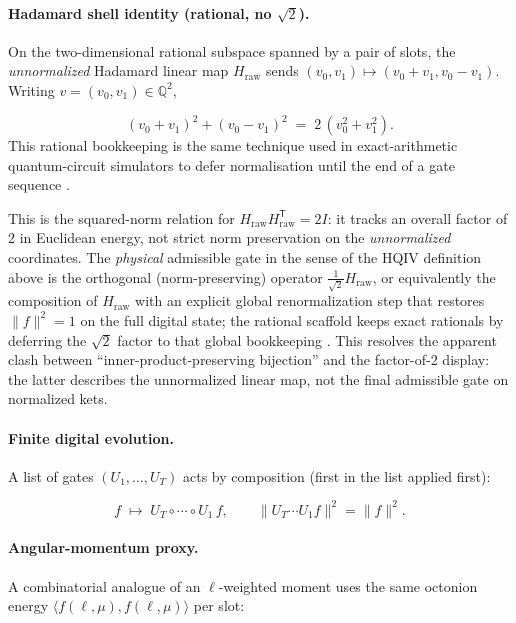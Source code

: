 \documentclass[11pt,a4paper]{article}
\theoremstyle{remark}
\begin{document}
\paragraph{Hadamard shell identity (rational, no $\sqrt{2}$).}
On the two-dimensional rational subspace spanned by a pair of slots, the \emph{unnormalized} Hadamard linear map $H_{\mathrm{raw}}$ sends $(v_0,v_1)\mapsto(v_0+v_1,v_0-v_1)$. Writing $v=(v_0,v_1)\in\mathbb{Q}^2$,

\begin{equation}
  (v_0+v_1)^2 + (v_0-v_1)^2 \;=\; 2\,(v_0^2+v_1^2).
\end{equation}
This rational bookkeeping is the same technique used in exact-arithmetic quantum-circuit simulators to defer normalisation until the end of a gate sequence \cite{smith2019exact}.

This is the squared-norm relation for $H_{\mathrm{raw}}H_{\mathrm{raw}}^{\mathsf T}=2I$: it tracks an overall factor of $2$ in Euclidean energy, not strict norm preservation on the \emph{unnormalized} coordinates. The \emph{physical} admissible gate in the sense of the HQIV definition above is the orthogonal (norm-preserving) operator $\tfrac{1}{\sqrt{2}}H_{\mathrm{raw}}$, or equivalently the composition of $H_{\mathrm{raw}}$ with an explicit global renormalization step that restores $\|f\|^2=1$ on the full digital state; the rational scaffold keeps exact rationals by deferring the $\sqrt{2}$ factor to that global bookkeeping \cite{hadamardMatrixMathWorld}. This resolves the apparent clash between ``inner-product-preserving bijection'' and the factor-of-$2$ display: the latter describes the unnormalized linear map, not the final admissible gate on normalized kets.

\paragraph{Finite digital evolution.}
A list of gates $(U_1,\ldots,U_T)$ acts by composition (first in the list applied first):

\begin{equation}
  f \;\mapsto\; U_T\circ\cdots\circ U_1\,f,
  \qquad
  \|U_T\cdots U_1 f\|^2=\|f\|^2.
\end{equation}

\paragraph{Angular-momentum proxy.}
A combinatorial analogue of an $\ell$-weighted moment uses the same octonion energy $\langle f(\ell,\mu),f(\ell,\mu)\rangle$ per slot:
\end{document}
